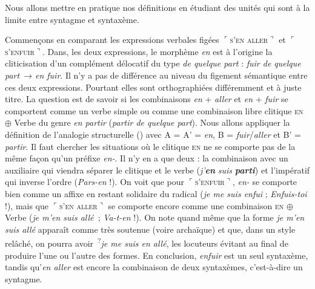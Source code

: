 Nous allons mettre en pratique nos définitions en étudiant des unités qui sont à la limite entre syntagme et syntaxème.

Commençons en comparant les expressions verbales figées $⌜$\textsc{s’en} \textsc{aller}$⌝$ et $⌜$\textsc{s’enfuir}$⌝$. Dans, les deux expressions, le morphème \textit{en} est à l’origine la cliticisation d’un complément délocatif du type \textit{de quelque part} : \textit{fuir de quelque part~}→ \textit{en fuir}. Il n’y a pas de différence au niveau du figement sémantique entre ces deux expressions. Pourtant elles sont orthographiées différemment et à juste titre. La question est de savoir si les combinaisons \textit{en} + \textit{aller} et \textit{en} + \textit{fuir} se comportent comme un verbe simple ou comme une combinaison libre clitique \textsc{en} ${\oplus}$ Verbe du genre \textit{en partir} (\textit{partir de quelque part}). Nous allons appliquer la définition de l’analogie structurelle () avec A = A’ = \textit{en}, B = \textit{fuir}/\textit{aller} et B’ = \textit{partir}. Il faut chercher les situations où le clitique \textsc{en} ne se comporte pas de la même façon qu’un préfixe \textit{en-}. Il n’y en a que deux : la combinaison avec un auxiliaire qui viendra séparer le clitique et le verbe (\textit{j’}\textbf{\textit{en}} \textit{suis} \textbf{\textit{parti}}) et l’impératif qui inverse l’ordre (\textit{Pars-en} !). On voit que pour $⌜$\textsc{s’enfuir}$⌝$, \textit{en-} se comporte bien comme un affixe en restant solidaire du radical (\textit{je me suis enfui} ; \textit{Enfuis-toi} !), mais que $⌜$\textsc{s’en} \textsc{aller}$⌝$ se comporte encore comme une combinaison \textsc{en} ${\oplus}$ Verbe (\textit{je m’en suis allé~}; \textit{Va-t-en} !). On note quand même que la forme \textit{je m’en suis allé} apparaît comme très soutenue (voire archaïque) et que, dans un style relâché, on pourra avoir~\textsuperscript{?}\textit{je me suis en allé}, les locuteurs évitant au final de produire l’une ou l’autre des formes. En conclusion, \textit{enfuir} est un seul syntaxème, tandis qu’\textit{en aller} est encore la combinaison de deux syntaxèmes, c’est-à-dire un syntagme.


